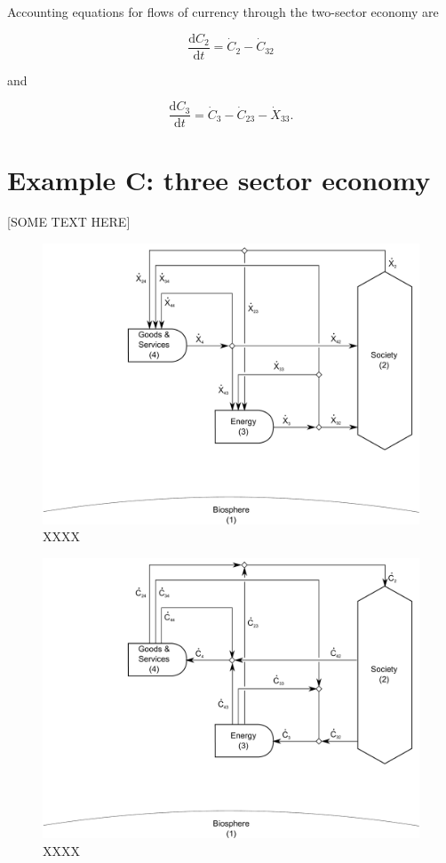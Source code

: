 Accounting equations for flows of currency through the two-sector
economy are

\begin{equation}
	\frac{\mathrm{d}C_2}{\mathrm{d}t}
	= \dot{C}_{2}
	- \dot{C}_{32}
\end{equation}

\noindent and

\begin{equation}
	\frac{\mathrm{d}C_3}{\mathrm{d}t}
	= \dot{C}_{3}
	- \dot{C}_{23}
	- \dot{X}_{33}.
\end{equation}


\section{Example C: three sector economy}

[SOME TEXT HERE]

\begin{figure}[h!]
\centering
\includegraphics[width=0.8\linewidth]{Part_3/Chapter_Values/images/3_sector_value.pdf}
\caption{XXXX}
\label{fig:C_value}
\end{figure}

\begin{figure}[h!]
\centering
\includegraphics[width=0.8\linewidth]{Part_3/Chapter_Values/images/3_sector_cash.pdf}
\caption{XXXX}
\label{fig:C_cash}
\end{figure}


